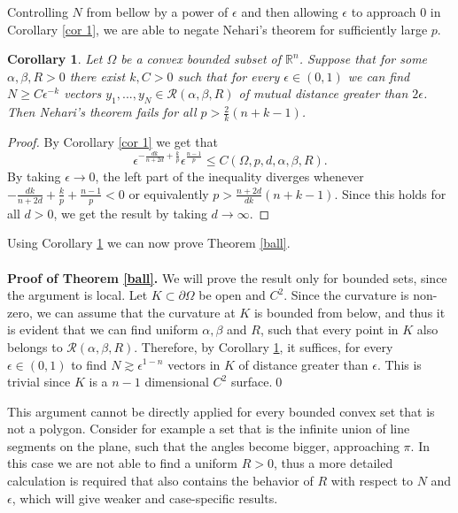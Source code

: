 \documentclass[footinclude=true]{amsart}
\theoremstyle{plain}
\newtheorem{cor}[theo]{Corollary}
\begin{document}
   Controlling $N$ from bellow by a power of $\epsilon$ and then allowing $\epsilon$ to approach $0$ in Corollary \ref{cor 1}, we are able to negate Nehari's theorem for sufficiently large $p$.
	\begin{cor}\label{cor 2}
		Let $\Omega$ be a convex bounded subset of $\mathbb{R}^{n}$. Suppose that for some $\alpha,\beta,R>0$ there exist $k,C>0$ such that for every $\epsilon\in (0,1)$ we can find $N\geq C \epsilon^{-k}$ vectors $y_{1},...,y_{N}\in\mathscr{R}(\alpha,\beta,R)$ of mutual distance greater than $2\epsilon$. Then Nehari's theorem fails for all $p>\frac{2}{k}(n+k-1)$.
	\end{cor}
	\begin{proof}
		By Corollary \ref{cor 1} we get that $$\epsilon^{-\frac{d k}{n+2d}+\frac{k}{p}}\epsilon^{\frac{n-1}{p}}\leq C(\Omega,p,d,\alpha,\beta,R).$$ By taking $\epsilon\to 0$, the left part of the inequality diverges whenever $-\frac{d k}{n+2d}+\frac{k}{p}+\frac{n-1}{p}<0$ or equivalently $p>\frac{n+2d}{d k}(n+k-1)$. Since this holds for all $d >0$, we get the result by taking $d\to \infty$.
	\end{proof}
	Using Corollary \ref{cor 2} we can now prove Theorem \ref{ball}. \\
	\\ \medspace \textbf{Proof of Theorem \ref{ball}.} We will prove the result only for bounded sets, since the argument is local. Let $K\subset \partial\Omega$ be open and $C^2$. Since the curvature is non-zero, we can assume that the curvature at $K$ is bounded from below, and thus it is evident that we can find uniform $\alpha,\beta$ and $R$, such that every point in $K$ also belongs to $\mathscr{R}(\alpha,\beta,R)$. Therefore, by Corollary \ref{cor 2}, it suffices, for every $\epsilon\in (0,1)$ to find $N \gtrsim \epsilon^{1-n}$ vectors in $K$ of distance greater than $\epsilon.$ This is trivial since $K$ is a $n-1$ dimensional $C^2$ surface.\qed \\
	\par This argument cannot be directly applied for every bounded convex set that is not a polygon. Consider for example a set that is the infinite union of line segments on the plane, such that the angles become bigger, approaching $\pi$. In this case we are not able to find a uniform $R>0$, thus a more detailed calculation is required that also contains the behavior of $R$ with respect to $N$ and $\epsilon$, which will give weaker and case-specific results.
	
\end{document}
